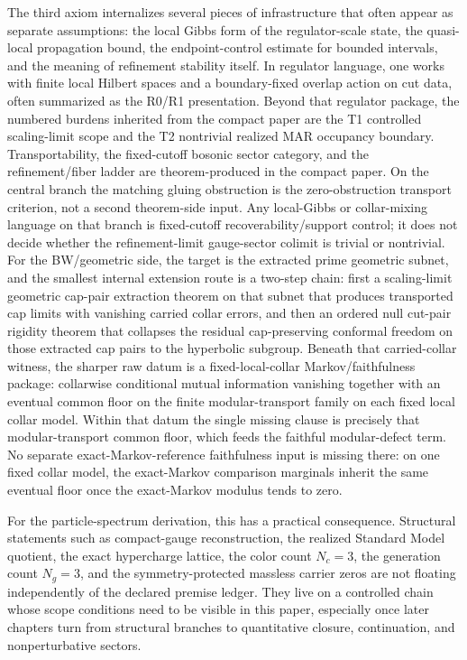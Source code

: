 \documentclass[11pt]{article}
\begin{document}
The third axiom internalizes several pieces of infrastructure that often appear as separate
assumptions: the local Gibbs form of the regulator-scale state, the
quasi-local propagation bound, the endpoint-control estimate for bounded intervals, and the
meaning of refinement stability itself. In regulator language, one works with finite local
Hilbert spaces and a boundary-fixed overlap action on cut data, often summarized as the R0/R1
presentation. Beyond that regulator package, the numbered burdens inherited from the compact
paper are the T1 controlled scaling-limit scope and the T2 nontrivial realized MAR occupancy
boundary. Transportability, the fixed-cutoff bosonic sector category, and the refinement/fiber
ladder are theorem-produced in the compact paper. On the central branch the matching gluing
obstruction is the zero-obstruction transport criterion, not a second theorem-side input. Any
local-Gibbs or collar-mixing language on that branch is fixed-cutoff recoverability/support
control; it does not decide whether the refinement-limit gauge-sector colimit is trivial or
nontrivial.
For the BW/geometric side, the target is the extracted prime geometric subnet, and the
smallest internal extension route is a two-step chain: first a scaling-limit geometric cap-pair extraction
theorem on that subnet that produces transported cap limits with vanishing carried collar errors,
and then an ordered null cut-pair rigidity theorem that
collapses the residual cap-preserving conformal freedom on those extracted cap pairs to the
hyperbolic subgroup. Beneath that carried-collar witness, the sharper raw datum is a fixed-local-collar
Markov/faithfulness package: collarwise conditional mutual information vanishing together with an
eventual common floor on the finite modular-transport family on each fixed local collar model. Within that datum the
single missing clause is precisely that modular-transport common floor, which feeds
the faithful modular-defect term. No separate exact-Markov-reference faithfulness input is
missing there: on one fixed collar model, the exact-Markov comparison marginals inherit the same
eventual floor once the exact-Markov modulus tends to zero.

For the particle-spectrum derivation, this has a practical consequence. Structural statements such
as compact-gauge reconstruction, the realized Standard Model quotient, the exact hypercharge
lattice, the color count \(N_c=3\), the generation count \(N_g=3\), and the symmetry-protected
massless carrier zeros are not floating independently of the declared premise ledger. They live on a
controlled chain whose scope conditions need to be visible in this paper,
especially once later chapters turn from structural branches to quantitative closure, continuation, and
nonperturbative sectors.
\end{document}
